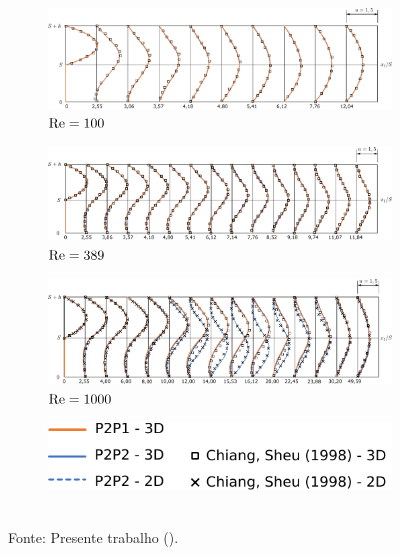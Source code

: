 \begin{figure}[h!]
    \centering
    \caption{Escoamento em degrau invertido - Perfis de velocidade.}
    \begin{subfigure}{0.9\textwidth}
        \includegraphics[width=\linewidth]{Figuras/backwardFacingStep/Re100.pdf}
        \caption{$\mathrm{Re}=100$}
    \end{subfigure}
    \begin{subfigure}{0.9\textwidth}
        \includegraphics[width=\linewidth]{Figuras/backwardFacingStep/Re389.pdf}
        \caption{$\mathrm{Re}=389$}
    \end{subfigure}
    \begin{subfigure}{0.9\textwidth}
        \includegraphics[width=\linewidth]{Figuras/backwardFacingStep/Re1000.pdf}
        \caption{$\mathrm{Re}=1000$}
    \end{subfigure}
    \begin{subfigure}{0.3\textwidth}
        \includegraphics[width=\linewidth]{Figuras/backwardFacingStep/legenda.pdf}
    \end{subfigure}
    \\Fonte: Presente trabalho (\the\year).
    \label{fig:BFSvel}
\end{figure}

